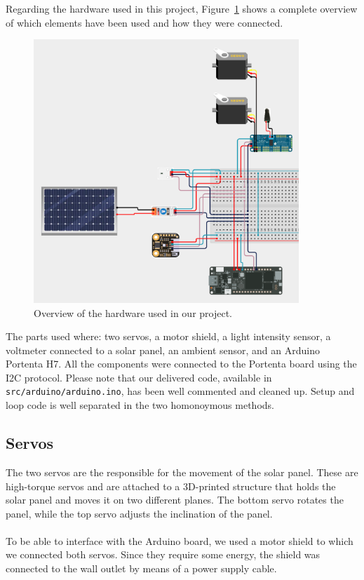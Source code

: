 Regarding the hardware used in this project, Figure~\ref{fig:circuit} shows a complete overview of which elements have been used and how they were connected.
\begin{figure}[h]
    \centering
    \includegraphics[width=10cm]{../assets/png/project-circuit}
    \caption{Overview of the hardware used in our project.}
    \label{fig:circuit}
\end{figure}
The parts used where: two servos, a motor shield, a light intensity sensor, a
voltmeter connected to a solar panel, an ambient sensor, and an Arduino Portenta
H7. All the components were connected to the Portenta board using the I2C
protocol. Please note that our delivered code, available in
\texttt{src/arduino/arduino.ino}, has been well commented and cleaned up. Setup
and loop code is well separated in the two homonoymous methods.

\subsection*{Servos}
The two servos are the responsible for the movement of the solar panel. These
are high-torque servos and are attached to a 3D-printed structure that holds the
solar panel and moves it on two different planes. The bottom servo rotates the
panel, while the top servo adjusts the inclination of the panel. \\ \\
To be able to interface with the Arduino board, we used a motor shield to which we connected both servos.
Since they require some energy, the shield was connected to the wall outlet by means of a power supply cable.

